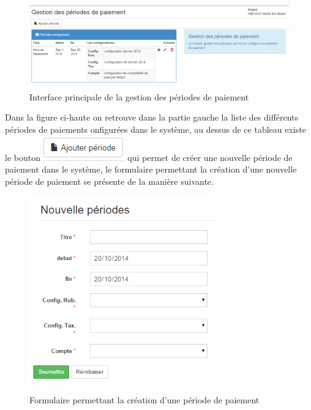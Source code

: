\documentclass[12pt,a4paper]{report}
\begin{document}
\begin{figure}[h]
\begin{center}
\includegraphics[width=14cm]{pic/GestPeriodPaiement.png}
\end{center}
\caption{Interface principale de la gestion des périodes de paiement}
\label{Interface principale de la gestion des périodes de paiement}
\end{figure}

Dans la figure ci-haute on retrouve dans la partie gauche la liste des différents périodes de paiements onfigurées dans le système, au dessus de ce tableau existe le bouton \includegraphics[scale=1]{pic/AjoutPeriode.png} qui permet de créer une nouvelle période de paiement dans le système, le formulaire permettant la création d'une nouvelle période de paiement se présente de la manière suivante.

\begin{figure}[h]
\begin{center}
\includegraphics[width=8cm]{pic/NewPeriod.png}
\end{center}
\caption{Formulaire permettant la création d'une période de paiement}
\label{Formulaire permettant la création d'une période de paiement}
\end{figure} 
\end{document}
